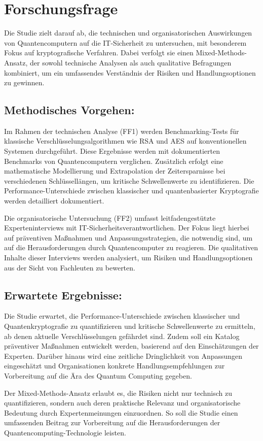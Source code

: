 \section{Forschungsfrage}
Die Studie zielt darauf ab, die technischen und organisatorischen Auswirkungen 
von Quantencomputern auf die IT-Sicherheit zu untersuchen, mit besonderem Fokus 
auf kryptografische Verfahren. Dabei verfolgt sie einen Mixed-Methods-Ansatz, 
der sowohl technische Analysen als auch qualitative Befragungen kombiniert, um 
ein umfassendes Verständnis der Risiken und Handlungsoptionen zu gewinnen.

\subsection{Methodisches Vorgehen:}

Im Rahmen der technischen Analyse (FF1) werden Benchmarking-Tests für klassische 
Verschlüsselungsalgorithmen wie RSA und AES auf konventionellen Systemen durchgeführt. 
Diese Ergebnisse werden mit dokumentierten Benchmarks von Quantencomputern verglichen. 
Zusätzlich erfolgt eine mathematische Modellierung und Extrapolation der Zeitersparnisse 
bei verschiedenen Schlüssellängen, um kritische Schwellenwerte zu identifizieren. Die 
Performance-Unterschiede zwischen klassischer und quantenbasierter Kryptografie werden 
detailliert dokumentiert.

Die organisatorische Untersuchung (FF2) umfasst leitfadengestützte Experteninterviews 
mit IT-Sicherheitsverantwortlichen. Der Fokus liegt hierbei auf präventiven Maßnahmen 
und Anpassungsstrategien, die notwendig sind, um auf die Herausforderungen durch 
Quantencomputer zu reagieren. Die qualitativen Inhalte dieser Interviews werden analysiert, 
um Risiken und Handlungsoptionen aus der Sicht von Fachleuten zu bewerten.

\subsection{Erwartete Ergebnisse:}

Die Studie erwartet, die Performance-Unterschiede zwischen klassischer und Quantenkryptografie 
zu quantifizieren und kritische Schwellenwerte zu ermitteln, ab denen aktuelle Verschlüsselungen 
gefährdet sind. Zudem soll ein Katalog präventiver Maßnahmen entwickelt werden, basierend auf den 
Einschätzungen der Experten. Darüber hinaus wird eine zeitliche Dringlichkeit von Anpassungen 
eingeschätzt und Organisationen konkrete Handlungsempfehlungen zur Vorbereitung auf die Ära des 
Quantum Computing gegeben.

Der Mixed-Methods-Ansatz erlaubt es, die Risiken nicht nur technisch zu quantifizieren, sondern 
auch deren praktische Relevanz und organisatorische Bedeutung durch Expertenmeinungen einzuordnen. 
So soll die Studie einen umfassenden Beitrag zur Vorbereitung auf die Herausforderungen der 
Quantencomputing-Technologie leisten.